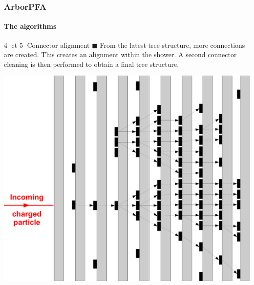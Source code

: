 \documentclass[8pt]{beamer}
\begin{document}
  \begin{frame}
  \frametitle{ArborPFA}
  \framesubtitle{The algorithms}
    \begin{block}{\textcircled{{\small 4}} et \textcircled{{\small 5}} Connector alignment}
      $\blacksquare$ From the latest tree structure, more connections are created. This creates an alignment within the shower. A second connector cleaning is then performed to obtain a final tree structure.
    \end{block}
    \begin{center}
      \includegraphics[width=0.6\linewidth]{ConnectorCleaning2.pdf}      
    \end{center}
  \end{frame}
  
\end{document}
